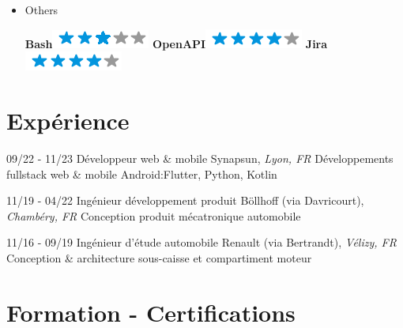 \documentclass[]{friggeri-cv}
\begin{document}
\begin{flushright}
\begin{multicols}{3}
\begin{itemize}
\item Others \
\begin{flushright}

\textbf{Bash}\includegraphics[scale=0.40]{res/img/3stars.png}
\textbf{OpenAPI}\includegraphics[scale=0.40]{res/img/4stars.png}
\textbf{Jira}\includegraphics[scale=0.40]{res/img/4stars.png}
\end{flushright}            


        \end{itemize}
        \end{multicols}
        \end{flushright}
        \vspace*{-0.65cm}
\section{Expérience}
\vspace*{-0.25cm}

\begin{entrylist}
  \entry
    {09/22 - 11/23}
    {Développeur web \& mobile}
    {Synapsun, \textit{Lyon, FR}}
    {Développements fullstack web \& mobile Android:\hspace*{8mm}Flutter, Python, Kotlin}
\end{entrylist}

\begin{entrylist}
  \entry
    {11/19 - 04/22}
    {Ingénieur développement produit}
    {Böllhoff (via Davricourt), \textit{Chambéry, FR}}
    {Conception produit mécatronique automobile}
\end{entrylist}

\begin{entrylist}
  \entry
    {11/16 - 09/19}
    {Ingénieur d'étude automobile}
    {Renault (via Bertrandt), \textit{Vélizy, FR}}
    {Conception \& architecture sous-caisse et compartiment moteur}
\end{entrylist}

\vspace*{-0.5cm}
\section{Formation - Certifications}
\vspace*{-0.25cm}
\end{document}
